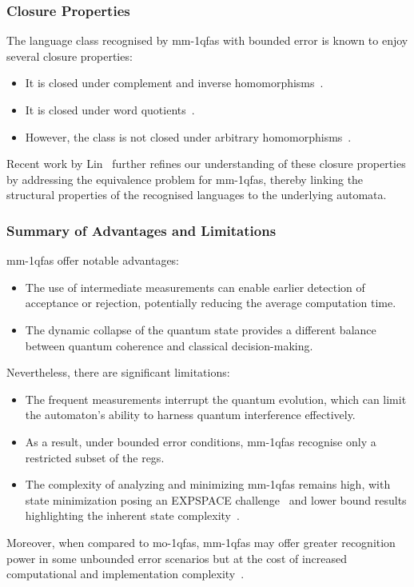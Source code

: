 \subsubsection{Closure Properties}
The language class recognised by \glspl{mm-1qfa} with bounded error is known to enjoy several closure properties:
\begin{itemize}
    \item It is closed under complement and inverse homomorphisms~\cite{brodsky2002characterizations}.
    \item It is closed under word quotients~\cite{brodsky2002characterizations}.
    \item However, the class is not closed under arbitrary homomorphisms~\cite{kondacs1997power,bertoni2003quantum}.
\end{itemize}
Recent work by Lin~\cite{lin2012another} further refines our understanding of these closure properties by addressing the equivalence problem for \glspl{mm-1qfa}, thereby linking the structural properties of the recognised languages to the underlying automata.

\subsubsection{Summary of Advantages and Limitations}
\glspl{mm-1qfa} offer notable advantages:
\begin{itemize}
    \item The use of intermediate measurements can enable earlier detection of acceptance or rejection, potentially reducing the average computation time.
    \item The dynamic collapse of the quantum state provides a different balance between quantum coherence and classical decision-making.
\end{itemize}
Nevertheless, there are significant limitations:
\begin{itemize}
    \item The frequent measurements interrupt the quantum evolution, which can limit the automaton's ability to harness quantum interference effectively.
    \item As a result, under bounded error conditions, \glspl{mm-1qfa} recognise only a restricted subset of the \glspl{reg}.
    \item The complexity of analyzing and minimizing \glspl{mm-1qfa} remains high, with state minimization posing an EXPSPACE challenge~\cite{mateus2012complexity} and lower bound results highlighting the inherent state complexity~\cite{ablayev2000lower}.
\end{itemize}
Moreover, when compared to \gls{mo-1qfa}s, \glspl{mm-1qfa} may offer greater recognition power in some unbounded error scenarios but at the cost of increased computational and implementation complexity~\cite{kondacs1997power,berzicna2001ambainis}.


